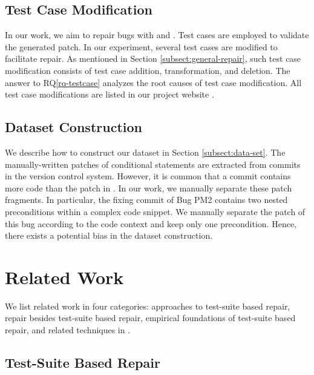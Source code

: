 \subsection{Test Case Modification} 
In our work, we aim to repair bugs with \buggyconditions and \preconditions. Test cases are employed to validate the generated  patch.  In our experiment, several test cases are modified to facilitate repair. As mentioned in Section \ref{subsect:general-repair}, such test case modification consists of test case addition, transformation, and deletion. The answer to RQ\ref{rq-testcase} analyzes the root causes of test case modification. All test case modifications are listed in our project website \cite{nopol2014}.

\subsection{Dataset Construction} 
We describe how to construct our dataset in Section \ref{subsect:data-set}. The manually-written patches of conditional statements are extracted from commits in the version control system. However, it is common that a commit contains more code than the patch in \buggyandpres. In our work, we manually separate these patch fragments. In particular, the fixing commit of Bug PM2 contains two nested preconditions within a complex code snippet. We manually separate the patch of this bug according to the code context and keep only one precondition. 
Hence, there exists a potential bias in the dataset construction.

\section{Related Work}
\label{sect:relatedwork}

We list related work in four categories: approaches to test-suite based repair, repair besides test-suite based repair, empirical foundations of test-suite based repair, and related techniques in \nopol. 

\subsection{Test-Suite Based Repair}
\label{subsect:related-approach}

